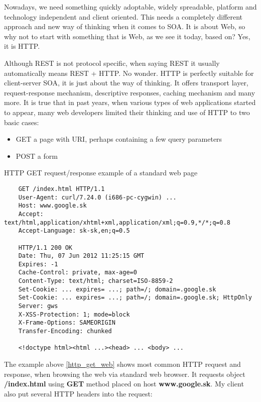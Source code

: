 	Nowadays, we need something quickly adoptable, widely spreadable, platform and technology independent and client
	oriented. This needs a completely different approach and new way of thinking when it comes to \gls{SOA}. It is about
	Web, so why not to start with something that is Web, as we see it today, based on? Yes, it is \gls{HTTP}.
	
	Although \gls{REST} is not protocol specific, when saying \gls{REST} it usually automatically means \gls{REST} +
	\gls{HTTP}. No wonder. \gls{HTTP} is perfectly suitable for client-server \gls{SOA}, it is just about the way of
	thinking. It offers transport layer, request-response mechanism, descriptive responses, caching mechanism and many
	more. It is true that in past years, when various types of web applications started to appear, many web developers
	limited their thinking and use of \gls{HTTP} to two basic cases:
	
	\begin{itemize}
	  \item GET a page with \gls{URI}, perhaps containing a few query parameters
	  \item POST a form
	\end{itemize}
	
	\begin{program}
	\caption{HTTP GET request/response example of a standard web page}\label{http_get_web}
	\begin{verbatim}
	GET /index.html HTTP/1.1
	User-Agent: curl/7.24.0 (i686-pc-cygwin) ...
	Host: www.google.sk
	Accept: text/html,application/xhtml+xml,application/xml;q=0.9,*/*;q=0.8
	Accept-Language: sk-sk,en;q=0.5

	HTTP/1.1 200 OK
	Date: Thu, 07 Jun 2012 11:25:15 GMT
	Expires: -1
	Cache-Control: private, max-age=0
	Content-Type: text/html; charset=ISO-8859-2
	Set-Cookie: ... expires= ...; path=/; domain=.google.sk
	Set-Cookie: ... expires= ...; path=/; domain=.google.sk; HttpOnly
	Server: gws
	X-XSS-Protection: 1; mode=block
	X-Frame-Options: SAMEORIGIN
	Transfer-Encoding: chunked

	<!doctype html><html ...><head> ... <body> ...
	\end{verbatim}
	\end{program}
	
	The example above \ref{http_get_web} shows most common HTTP request and response, when browsing the web via standard
	web browser. It requests object \textbf{/index.html} using \textbf{GET} method placed on host \textbf{www.google.sk}.
	My client also put several HTTP headers into the request:
	
